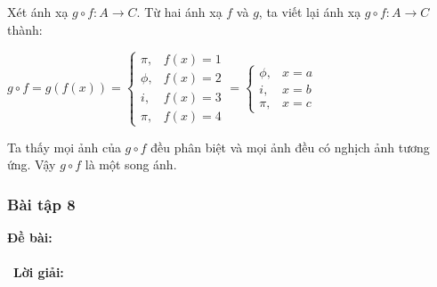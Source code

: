 \documentclass[a4paper]{article}
\begin{document}
Xét ánh xạ $g\circ f : A \rightarrow C$.
Từ hai ánh xạ $f$ và $g$, ta viết lại ánh xạ $g\circ f : A \rightarrow C$ thành: 
\begin{center}
$g\circ f = g(f(x)) = \begin{cases} \pi, & f(x)=1 \\ \phi, & f(x) = 2 \\ i, & f(x)=3 \\ \pi, & f(x)=4 \end{cases} = \begin{cases} \phi, & x = a \\ i, & x=b \\ \pi, & x=c \end{cases}$
\end{center}
Ta thấy mọi ảnh của $g \circ f$ đều phân biệt và mọi ảnh đều có nghịch ảnh tương ứng. Vậy $g \circ f$ là một song ánh.
\clearpage
\subsubsection{Bài tập 8}
\textbf{Đề bài:} 
\\\ \\\
\textbf{Lời giải:} \\\ \\\
\clearpage
\end{document}
